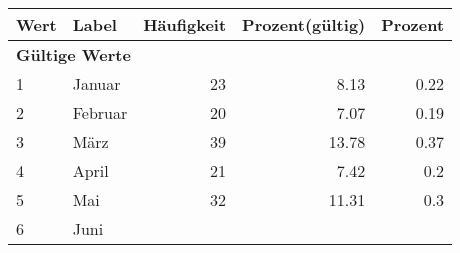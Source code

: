      \begin{longtable}{lXrrr}
     \toprule
     \textbf{Wert} & \textbf{Label} & \textbf{Häufigkeit} & \textbf{Prozent(gültig)} & \textbf{Prozent} \\
     \endhead
     \midrule
     \multicolumn{5}{l}{\textbf{Gültige Werte}}\\

     1 &
     \multicolumn{1}{X}{ Januar   } &


       \num{23} &
       \num[round-mode=places,round-precision=2]{8,13} &
         \num[round-mode=places,round-precision=2]{0,22} \\

     2 &
     \multicolumn{1}{X}{ Februar   } &


       \num{20} &
       \num[round-mode=places,round-precision=2]{7,07} &
         \num[round-mode=places,round-precision=2]{0,19} \\

     3 &
     \multicolumn{1}{X}{ März   } &


       \num{39} &
       \num[round-mode=places,round-precision=2]{13,78} &
         \num[round-mode=places,round-precision=2]{0,37} \\

     4 &
     \multicolumn{1}{X}{ April   } &


       \num{21} &
       \num[round-mode=places,round-precision=2]{7,42} &
         \num[round-mode=places,round-precision=2]{0,2} \\

     5 &
     \multicolumn{1}{X}{ Mai   } &


       \num{32} &
       \num[round-mode=places,round-precision=2]{11,31} &
         \num[round-mode=places,round-precision=2]{0,3} \\

     6 &
     \multicolumn{1}{X}{ Juni   } &



\end{longtable}
